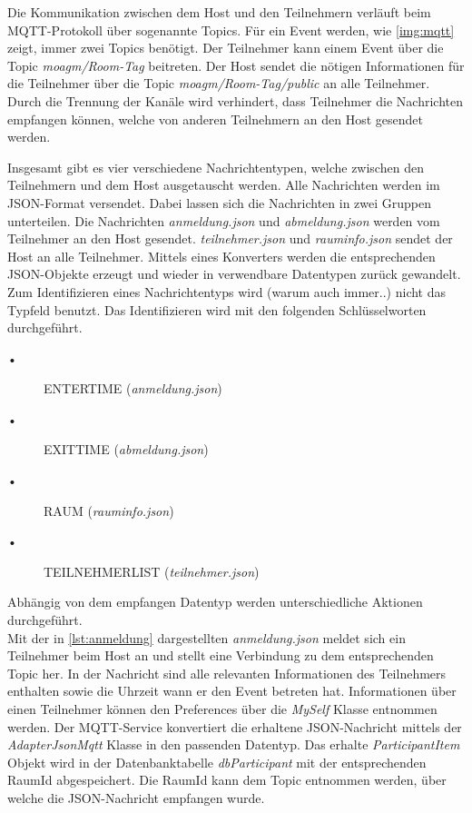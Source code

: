 Die Kommunikation zwischen dem Host und den Teilnehmern verläuft beim MQTT-Protokoll über sogenannte Topics. 
Für ein Event werden, wie \cref{img:mqtt} zeigt, immer zwei Topics benötigt. 
Der Teilnehmer kann einem Event über die Topic \textit{moagm/Room-Tag} beitreten. 
Der Host sendet die nötigen Informationen für die Teilnehmer über die Topic \textit{moagm/Room-Tag/public} an alle Teilnehmer. 
Durch die Trennung der Kanäle wird verhindert, dass Teilnehmer die Nachrichten empfangen können, welche von anderen Teilnehmern an den Host gesendet werden.

Insgesamt gibt es vier verschiedene Nachrichtentypen, welche zwischen den Teilnehmern und dem Host ausgetauscht werden. Alle Nachrichten werden im JSON-Format versendet. 
Dabei lassen sich die Nachrichten in zwei Gruppen unterteilen.
Die Nachrichten \textit{anmeldung.json} und \textit{abmeldung.json} werden vom Teilnehmer an den Host gesendet. 
\textit{teilnehmer.json} und \textit{rauminfo.json} sendet der Host an alle Teilnehmer. 
Mittels eines Konverters werden die entsprechenden JSON-Objekte erzeugt und wieder in verwendbare Datentypen zurück gewandelt. 
Zum Identifizieren eines Nachrichtentyps wird (warum auch immer..) nicht das Typfeld benutzt. 
Das Identifizieren wird mit den folgenden Schlüsselworten durchgeführt.
\begin{description}
\item[•] ENTERTIME (\textit{anmeldung.json})
\item[•] EXITTIME (\textit{abmeldung.json})
\item[•] RAUM (\textit{rauminfo.json})
\item[•] TEILNEHMERLIST (\textit{teilnehmer.json})
\end{description}
Abhängig von dem empfangen Datentyp werden unterschiedliche Aktionen durchgeführt.
\\
Mit der in \cref{lst:anmeldung} dargestellten \textit{anmeldung.json} meldet sich ein Teilnehmer beim Host an und stellt eine Verbindung zu dem entsprechenden Topic her. 
In der Nachricht sind alle relevanten Informationen des Teilnehmers enthalten sowie die Uhrzeit wann er den Event betreten hat.
Informationen über einen Teilnehmer können den Preferences über die \textit{MySelf} Klasse entnommen werden. 
Der MQTT-Service konvertiert die erhaltene JSON-Nachricht mittels der \textit{AdapterJsonMqtt} Klasse in den passenden Datentyp. 
Das erhalte \textit{ParticipantItem} Objekt wird in der Datenbanktabelle \textit{dbParticipant} mit der  entsprechenden RaumId abgespeichert. 
Die RaumId kann dem Topic entnommen werden, über welche die JSON-Nachricht empfangen wurde. 
